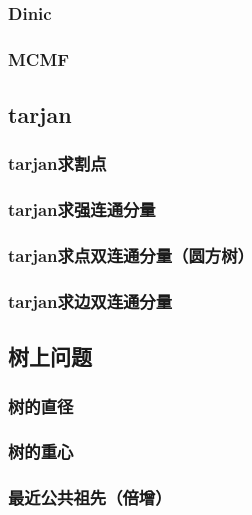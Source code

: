 \documentclass[10pt,a4paper]{article}
\begin{document}
\subsubsection{Dinic}

\subsubsection{MCMF}

\subsection{tarjan}
\subsubsection{tarjan求割点}
\begin{spacing}{1.5}

\end{spacing}

\subsubsection{tarjan求强连通分量}
\begin{spacing}{1.5}

\end{spacing}

\subsubsection{tarjan求点双连通分量（圆方树）}

\subsubsection{tarjan求边双连通分量}

\subsection{树上问题}
\subsubsection{树的直径}

\subsubsection{树的重心}

\subsubsection{最近公共祖先（倍增）}

\end{document}
